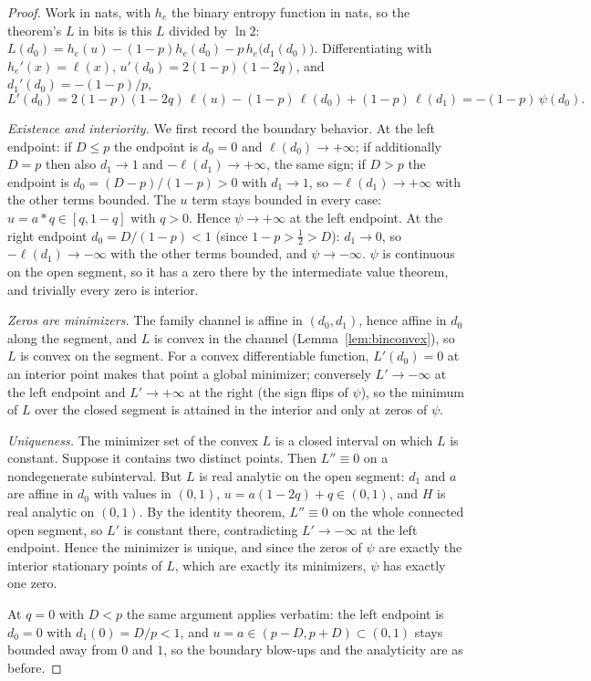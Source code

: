 ﻿\documentclass[11pt,onecolumn]{IEEEtran}
\begin{document}
\begin{proof}
Work in nats, with $h_e$ the binary entropy function in nats, so the
theorem's $L$ in bits is this $L$ divided by $\ln2$:
$L(d_0)=h_e(u)-(1-p)h_e(d_0)-p\,h_e\bigl(d_1(d_0)\bigr)$. Differentiating
with $h_e'(x)=\ell(x)$, $u'(d_0)=2(1-p)(1-2q)$, and $d_1'(d_0)=-(1-p)/p$,
\[
L'(d_0)=2(1-p)(1-2q)\,\ell(u)-(1-p)\,\ell(d_0)+(1-p)\,\ell(d_1)
=-(1-p)\,\psi(d_0).
\]

\emph{Existence and interiority.} We first record the boundary
behavior. At the left
endpoint: if $D\le p$ the endpoint is $d_0=0$ and
$\ell(d_0)\to+\infty$; if additionally $D=p$ then also $d_1\to1$ and
$-\ell(d_1)\to+\infty$, the same sign; if $D>p$ the endpoint is
$d_0=(D-p)/(1-p)>0$ with $d_1\to1$, so $-\ell(d_1)\to+\infty$ with the
other terms bounded. The $u$ term stays bounded in every case:
$u=a*q\in[q,1-q]$ with $q>0$. Hence $\psi\to+\infty$ at the left
endpoint. At the right endpoint $d_0=D/(1-p)<1$ (since $1-p>\tfrac12>D$):
$d_1\to0$, so $-\ell(d_1)\to-\infty$ with the other terms bounded, and
$\psi\to-\infty$. $\psi$ is continuous on the open segment, so it has a
zero there by the intermediate value theorem, and trivially every zero
is interior.

\emph{Zeros are minimizers.} The family channel is affine in
$(d_0,d_1)$, hence affine in $d_0$ along the segment, and
$L$ is convex in the channel (Lemma~\ref{lem:binconvex}), so $L$ is
convex on the segment. For
a convex differentiable function, $L'(d_0)=0$ at an interior point
makes that point a global minimizer; conversely
$L'\to-\infty$ at the left endpoint and $L'\to+\infty$ at the right
(the sign flips of $\psi$), so the minimum of $L$ over the closed
segment is attained in the interior and only at zeros of $\psi$.

\emph{Uniqueness.} The minimizer set of the convex $L$ is a closed
interval on which $L$ is constant. Suppose it contains two distinct
points. Then $L''\equiv0$ on a nondegenerate subinterval. But $L$ is
real analytic on the open segment: $d_1$ and $a$ are affine in $d_0$
with values in $(0,1)$, $u=a(1-2q)+q\in(0,1)$, and $H$ is real analytic
on $(0,1)$. By the identity theorem, $L''\equiv0$ on the whole
connected open segment, so $L'$ is constant there, contradicting
$L'\to-\infty$ at the left endpoint. Hence the minimizer is unique, and
since the zeros of $\psi$ are exactly the interior stationary points of
$L$, which are exactly its minimizers, $\psi$ has exactly one zero.

At $q=0$ with $D<p$ the same argument applies verbatim: the left
endpoint is $d_0=0$ with $d_1(0)=D/p<1$, and $u=a\in(p-D,p+D)\subset
(0,1)$ stays bounded away from $0$ and $1$, so the boundary blow-ups
and the analyticity are as before.
\end{proof}
\end{document}
